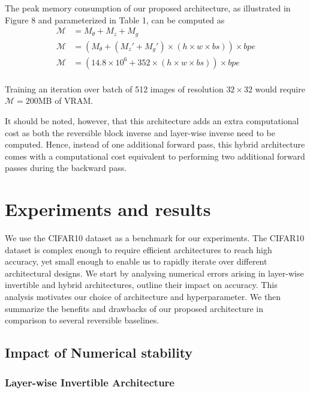 \documentclass[twocolumn]{bmcart}
\begin{document}
The peak memory consumption of our proposed architecture, as illustrated in Figure 8 and parameterized in Table 1, can be computed as  
\begin{subequations}
\begin{align}
\mathcal{M} &= M_{\theta} + M_{z} + M_{g} \\
\mathcal{M} &= (M_{\theta} + (M_z' + M_{g}') \times (h \times w \times bs)) \times bpe \\
\mathcal{M} &= (14.8 \times 10^6 + 352 \times (h \times w \times bs)) \times bpe \\
\end{align}
\end{subequations}

Training an iteration over batch of 512 images of resolution $32 \times 32$ would require $\mathcal{M}=200$MB of VRAM. 

It should be noted, however, that this architecture adds an extra computational cost as both the reversible block inverse and layer-wise inverse need to be computed.
Hence, instead of one additional forward pass, this hybrid architecture comes with a computational cost equivalent to performing two additional forward passes
during the backward pass. 


\section{Experiments and results}

We use the CIFAR10 dataset as a benchmark for our experiments.
The CIFAR10 dataset is complex enough to require efficient architectures to reach high accuracy, 
yet small enough to enable us to rapidly iterate over different architectural designs.
We start by analysing numerical errors arising in layer-wise invertible and hybrid architectures, 
outline their impact on accuracy.
This analysis motivates our choice of architecture and hyperparameter.
We then summarize the benefits and drawbacks of our proposed architecture in comparison to several reversible baselines.

\subsection{Impact of Numerical stability}

\subsubsection{Layer-wise Invertible Architecture}
\end{document}
